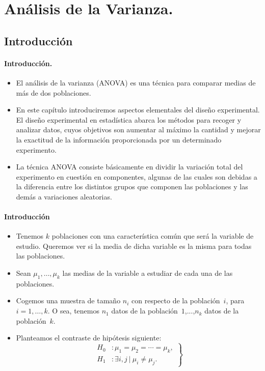  
%

\chapter{Análisis de la Varianza.}
\section{Introducción}

\begin{frame}
\frametitle{Introducción.}

\begin{itemize}
\item<2-> El análisis de la varianza (ANOVA) es una técnica para comparar medias de más de dos poblaciones. 
\item<3-> En este capítulo introduciremos aspectos elementales del diseño experimental. El diseño experimental en estadística abarca los métodos para recoger y analizar datos, cuyos objetivos son aumentar al máximo la cantidad y mejorar la exactitud de la información proporcionada por un determinado experimento. 
\item<4-> La técnica ANOVA consiste básicamente en dividir la variación total del experimento en cuestión en componentes, algunas de las cuales son debidas a la diferencia entre los distintos grupos que componen las poblaciones y las demás a variaciones aleatorias.
\end{itemize}
\end{frame}

\begin{frame}
\frametitle{Introducción}

\begin{itemize}
\item<2-> Tenemos $k$ poblaciones con una característica común que será la variable de estudio. Queremos ver si la media de dicha variable es la misma para todas las poblaciones. 

\item<3-> Sean $\mu_1,\ldots,\mu_k$ las medias de la variable a estudiar de cada una de las poblaciones.

\item<4-> Cogemos una muestra de tamaño $n_i$ con respecto de la población~$i$, para $i=1,\ldots,k$. O sea, tenemos $n_1$ datos de la población~$1$,...,$n_k$ datos de la población~$k$. 

\item<5-> Planteamos el contraste de hipótesis siguiente:
\[
\left.
\begin{array}{rl}
H_0 &: \mu_1 =\mu_2 =\cdots =\mu_k, \\
H_1 &: \exists i,j \ |\ \mu_i \not=\mu_j.
\end{array}
\right\}
\]

\end{itemize}

\end{frame}

